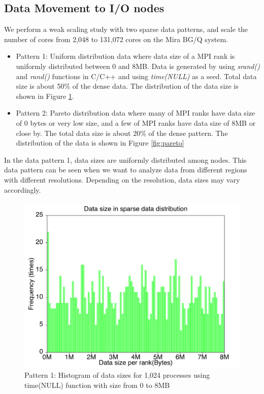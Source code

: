 \documentclass[final,5p,times]{elsarticle}
\begin{document}

\subsection{Data Movement to I/O nodes}
We perform a weak scaling study with two sparse data patterns, and scale the number of cores from 2,048 to 131,072 cores on the Mira BG/Q system. 

\begin{itemize}
\item Pattern 1: Uniform distribution data where data size of a MPI rank is uniformly distributed between 0 and 8MB.  Data is generated by using \textit{srand()} and \textit{rand()} functions in C/C++ and using \textit{time(NULL)} as a seed.  Total data size is about 50\% of the dense data. The distribution of the data size is shown in Figure \ref{fig:uniform}.
\item Pattern 2: Pareto distribution data where many of MPI ranks have data size of 0 bytes or very low size, and a few of MPI ranks have data size of 8MB or close by. The total data size is about 20\% of the dense pattern. The distribution of the data is shown in Figure \ref{fig:pareto}
\end{itemize}

In the data pattern 1, data sizes are uniformly distributed among nodes. This data pattern can be seen when we want to analyze data from different regions with different resolutions. Depending on the resolution, data sizes may vary accordingly.

\begin{figure}[!htb]
\vspace{-0.2in}
\centering
\includegraphics[scale=0.3]{figures/uniform.pdf}
\caption{Pattern 1: Histogram of data sizes for 1,024 processes using time(NULL) function with size from 0 to 8MB}
\label{fig:uniform}
\vspace{-0.1in}
\end{figure}
\end{document}
